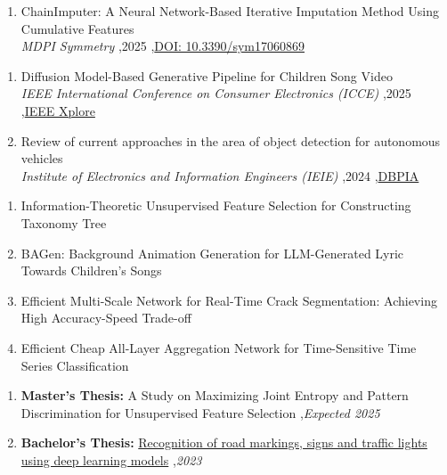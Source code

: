 \documentclass[letterpaper,10pt]{article}
\begin{document}



\begin{enumerate}
\item ChainImputer: A Neural Network-Based Iterative Imputation Method Using Cumulative Features\\
\textit{MDPI Symmetry} \sep 2025 \sep \href{https://www.mdpi.com/2073-8994/17/6/869}{DOI: 10.3390/sym17060869}
\end{enumerate}

\begin{enumerate}
\item Diffusion Model-Based Generative Pipeline for Children Song Video\\
\textit{IEEE International Conference on Consumer Electronics (ICCE)} \sep 2025 \sep \href{https://ieeexplore.ieee.org/abstract/document/10930103}{IEEE Xplore}
\item Review of current approaches in the area of object detection for autonomous vehicles\\
\textit{Institute of Electronics and Information Engineers (IEIE)} \sep 2024 \sep \href{https://www.dbpia.co.kr/Journal/articleDetail?nodeId=NODE11891143}{DBPIA}
\end{enumerate}

\begin{enumerate}
\item Information-Theoretic Unsupervised Feature Selection for Constructing Taxonomy Tree
\item BAGen: Background Animation Generation for LLM-Generated Lyric Towards Children's Songs
\item Efficient Multi-Scale Network for Real-Time Crack Segmentation: Achieving High Accuracy-Speed Trade-off
\item Efficient Cheap All-Layer Aggregation Network for Time-Sensitive Time Series Classification
\end{enumerate}

\begin{enumerate}
\item \textbf{Master's Thesis:} A Study on Maximizing Joint Entropy and Pattern Discrimination for Unsupervised Feature Selection \sep \textit{Expected 2025}
\item \textbf{Bachelor's Thesis:} \href{https://github.com/KhrTim/Traffic-Signs-Recognition-Thesis}{Recognition of road markings, signs and traffic lights using deep learning models} \sep \textit{2023}
\end{enumerate}
\end{document}

